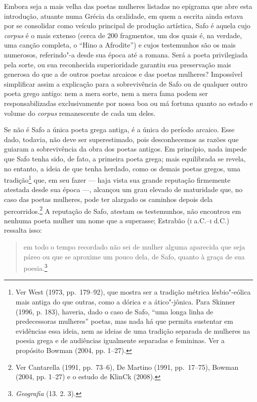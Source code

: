 Embora seja a mais velha das poetas mulheres listadas no epigrama que abre esta
introdução, atuante numa Grécia da oralidade, em quem a escrita ainda estava
por se consolidar como veículo principal de produção artística, Safo é aquela
cujo \textit{corpus} é o mais extenso (cerca de 200 fragmentos, um dos quais é,
na verdade, uma canção completa, o “Hino a Afrodite”) e cujos testemunhos são
os mais numerosos, referindo"-a desde sua época até a romana. Será a poeta
privilegiada pela sorte, ou sua reconhecida superioridade garantiu sua
preservação mais generosa do que a de outros poetas arcaicos e das poetas
mulheres? Impossível simplificar assim a explicação
para a sobrevivência de Safo ou de qualquer outro poeta grego antigo: nem a
mera sorte, nem a mera fama podem ser responsabilizadas exclusivamente por
nossa boa ou má fortuna quanto ao estado e volume do \textit{corpus}
remanescente de cada um deles.

Se não é Safo a única poeta grega antiga, é a única do período
arcaico. Esse dado, todavia, não deve ser superestimado, pois desconhecemos as
razões que guiaram a sobrevivência da obra dos poetas antigos.
Em princípio, nada impede que Safo tenha sido, de fato, a primeira
poeta grega; mais equilibrada se revela, no entanto, a ideia de que tenha
herdado, como os demais poetas gregos, uma tradição\footnote{ Ver West (1973, pp.~179--92), que mostra ser a
tradição métrica lésbio"-eólica mais antiga do que outras, como a dórica e a
ático"-jônica. Para Skinner (1996, p. 183), haveria, dado o caso de Safo, “uma
longa linha de predecessoras mulheres” poetas, mas nada há que permita sustentar em evidências essa ideia, nem as ideias de uma tradição separada de mulheres na poesia grega e de audiências igualmente separadas e femininas. Ver a propósito Bowman (2004, pp. 1--27).} que, em seu fazer --- haja vista
sua grande reputação firmemente atestada desde sua época ---, alcançou um grau
elevado de maturidade que, no caso das poetas mulheres, pode ter alargado os
caminhos depois dela percorridos.\footnote{ Ver Cantarella (1991, pp.~73--6), De
Martino (1991, pp.~17--75), Bowman (2004, pp. 1--27) e o estudo de KlinCk (2008).} A reputação de Safo, atestam os
testemunhos, não encontrou em nenhuma poeta mulher um nome que a
superasse; Estrabão (\textsc{i} a.C.--\textsc{i} d.C.) ressalta isso: 

\begin{quote}
em todo o tempo recordado não sei de mulher
alguma aparecida que seja páreo ou que se aproxime um pouco dela, de Safo,
quanto à graça de sua poesia.\footnote{ \textit{Geografia} (13. 2. 3).}
\end{quote}

